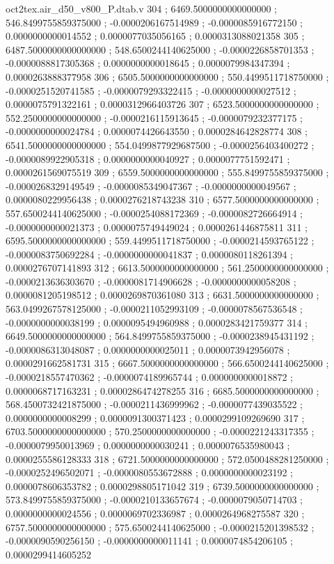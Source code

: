 \begin{filecontents}[overwrite]{oct2tex.air_d50_v800_P.dtab.v}
304 ; 6469.5000000000000000 ; 546.8499755859375000 ; -0.0000206167514989 ; -0.0000085916772150 ; 0.0000000000014552 ; 0.0000077035056165 ; 0.0000313088021358
305 ; 6487.5000000000000000 ; 548.6500244140625000 ; -0.0000226858701353 ; -0.0000088817305368 ; 0.0000000000018645 ; 0.0000079984347394 ; 0.0000263888377958
306 ; 6505.5000000000000000 ; 550.4499511718750000 ; -0.0000251520741585 ; -0.0000079293322415 ; -0.0000000000027512 ; 0.0000075791322161 ; 0.0000312966403726
307 ; 6523.5000000000000000 ; 552.2500000000000000 ; -0.0000216115913645 ; -0.0000079232377175 ; -0.0000000000024784 ; 0.0000074426643550 ; 0.0000284642828774
308 ; 6541.5000000000000000 ; 554.0499877929687500 ; -0.0000256403400272 ; -0.0000089922905318 ; 0.0000000000040927 ; 0.0000077751592471 ; 0.0000261569075519
309 ; 6559.5000000000000000 ; 555.8499755859375000 ; -0.0000268329149549 ; -0.0000085349047367 ; -0.0000000000049567 ; 0.0000080229956438 ; 0.0000276218743238
310 ; 6577.5000000000000000 ; 557.6500244140625000 ; -0.0000254088172369 ; -0.0000082726664914 ; -0.0000000000021373 ; 0.0000075749449024 ; 0.0000261446875811
311 ; 6595.5000000000000000 ; 559.4499511718750000 ; -0.0000214593765122 ; -0.0000083750692284 ; -0.0000000000041837 ; 0.0000080118261394 ; 0.0000276707141893
312 ; 6613.5000000000000000 ; 561.2500000000000000 ; -0.0000213636303670 ; -0.0000081714906628 ; -0.0000000000058208 ; 0.0000081205198512 ; 0.0000269870361080
313 ; 6631.5000000000000000 ; 563.0499267578125000 ; -0.0000211052993109 ; -0.0000078567536548 ; -0.0000000000038199 ; 0.0000095494960988 ; 0.0000283421759377
314 ; 6649.5000000000000000 ; 564.8499755859375000 ; -0.0000238945431192 ; -0.0000086313048087 ; 0.0000000000025011 ; 0.0000073942956078 ; 0.0000291662581731
315 ; 6667.5000000000000000 ; 566.6500244140625000 ; -0.0000218557470362 ; -0.0000074189965744 ; 0.0000000000018872 ; 0.0000068717163231 ; 0.0000286474278255
316 ; 6685.5000000000000000 ; 568.4500732421875000 ; -0.0000211436999962 ; -0.0000077439035522 ; 0.0000000000008299 ; 0.0000091300371423 ; 0.0000299109269690
317 ; 6703.5000000000000000 ; 570.2500000000000000 ; -0.0000221243317355 ; -0.0000079950013969 ; 0.0000000000030241 ; 0.0000076535980043 ; 0.0000255586128333
318 ; 6721.5000000000000000 ; 572.0500488281250000 ; -0.0000252496502071 ; -0.0000080553672888 ; 0.0000000000023192 ; 0.0000078606353782 ; 0.0000298805171042
319 ; 6739.5000000000000000 ; 573.8499755859375000 ; -0.0000210133657674 ; -0.0000079050714703 ; 0.0000000000024556 ; 0.0000069702336987 ; 0.0000264968275587
320 ; 6757.5000000000000000 ; 575.6500244140625000 ; -0.0000215201398532 ; -0.0000090590256150 ; -0.0000000000011141 ; 0.0000074854206105 ; 0.0000299414605252

\end{filecontents}
